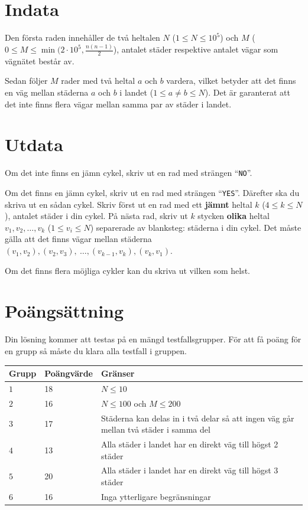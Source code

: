 \section*{Indata}
Den första raden innehåller de två heltalen $N$ ($1 \le N \le 10^5$) och $M$ ($0 \le M \le \min(2 \cdot 10^5, \frac{n(n-1)}{2}$), antalet städer respektive antalet vägar som vägnätet består av.

Sedan följer $M$ rader med två heltal $a$ och $b$ vardera, vilket betyder att det finns en väg mellan städerna $a$ och $b$ i landet ($1\le a \neq b \le N$).
Det är garanterat att det inte finns flera vägar mellan samma par av städer i landet.

\section*{Utdata}
Om det inte finns en jämn cykel, skriv ut en rad med strängen ``\texttt{NO}''.

Om det finns en jämn cykel, skriv ut en rad med strängen ``\texttt{YES}''.
Därefter ska du skriva ut en sådan cykel.
Skriv först ut en rad med ett \textbf{jämnt} heltal $k$ ($4\le k \le N$), antalet städer i din cykel.
På nästa rad, skriv ut $k$ stycken \textbf{olika} heltal $v_{1}, v_{2}, \ldots, v_{k}$ ($1\le v_{i}\le N$) separerade av blanksteg: städerna i din cykel.
Det måste gälla att det finns vägar mellan städerna $(v_{1},v_{2}), (v_{2},v_{3}),\ \ldots, (v_{k-1},v_{k}), (v_{k}, v_{1})$.

Om det finns flera möjliga cykler kan du skriva ut vilken som helst.

\section*{Poängsättning}
Din lösning kommer att testas på en mängd testfallsgrupper.
För att få poäng för en grupp så måste du klara alla testfall i gruppen.

\noindent
\begin{tabular}{| l | l | l |}
  \hline
  Grupp & Poängvärde & Gränser \\ \hline
  $1$ & 18 & $N\le 10$ \\ \hline
  $2$ & 16 & $N\le 100$ och $M\le 200$ \\ \hline
  $3$  & 17 & Städerna kan delas in i två delar så att ingen väg går mellan två städer i samma del \\ \hline
  $4$  & 13 & Alla städer i landet har en direkt väg till högst 2 städer \\ \hline
  $5$  & 20 & Alla städer i landet har en direkt väg till högst 3 städer \\ \hline
  $6$  & 16 & Inga ytterligare begränsningar \\ \hline
\end{tabular}
